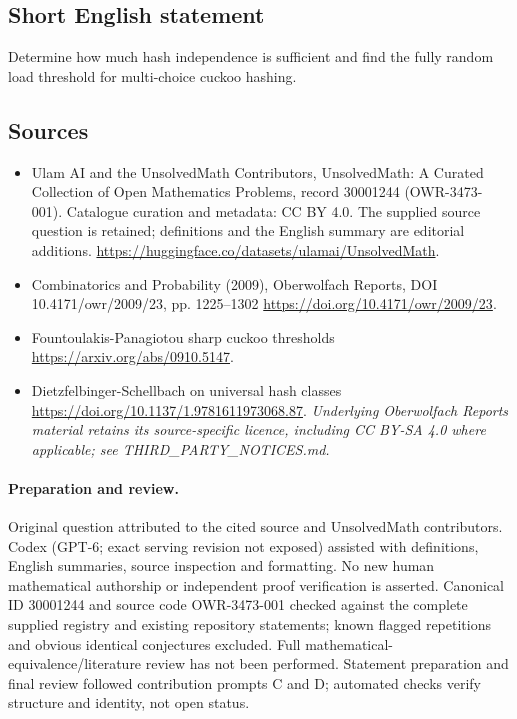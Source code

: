 \documentclass[11pt]{article}
\begin{document}
\subsection{Short English statement}
Determine how much hash independence is sufficient and find the fully random load threshold for multi-choice cuckoo hashing.
\subsection{Sources}
\begin{itemize}
\item[\hypertarget{source:30001244:1}{S1}] Ulam AI and the UnsolvedMath Contributors, UnsolvedMath: A Curated Collection of Open Mathematics Problems, record 30001244 (OWR-3473-001). Catalogue curation and metadata: CC BY 4.0. The supplied source question is retained; definitions and the English summary are editorial additions.
\url{https://huggingface.co/datasets/ulamai/UnsolvedMath}.
\item[\hypertarget{source:30001244:2}{S2}] Combinatorics and Probability (2009), Oberwolfach Reports, DOI 10.4171/owr/2009/23, pp. 1225--1302
\url{https://doi.org/10.4171/owr/2009/23}.
\item[\hypertarget{source:30001244:3}{S3}] Fountoulakis-Panagiotou sharp cuckoo thresholds
\url{https://arxiv.org/abs/0910.5147}.
\item[\hypertarget{source:30001244:4}{S4}] Dietzfelbinger-Schellbach on universal hash classes
\url{https://doi.org/10.1137/1.9781611973068.87}.
\textit{Underlying Oberwolfach Reports material retains its source-specific licence, including CC BY-SA 4.0 where applicable; see THIRD\_PARTY\_NOTICES.md.}
\end{itemize}
\paragraph{Preparation and review.}
Original question attributed to the cited source and UnsolvedMath contributors. Codex (GPT-6; exact serving revision not exposed) assisted with definitions, English summaries, source inspection and formatting. No new human mathematical authorship or independent proof verification is asserted. Canonical ID 30001244 and source code OWR-3473-001 checked against the complete supplied registry and existing repository statements; known flagged repetitions and obvious identical conjectures excluded. Full mathematical-equivalence/literature review has not been performed. Statement preparation and final review followed contribution prompts C and D; automated checks verify structure and identity, not open status.
\label{end:30001244}
\end{document}
